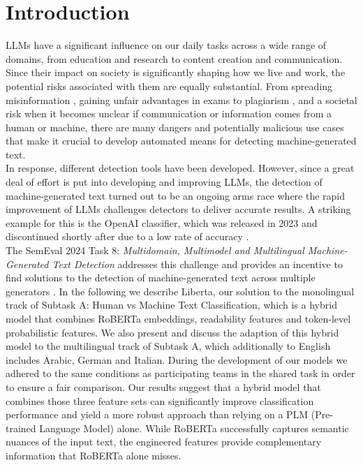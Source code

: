 \documentclass[11pt]{article}
\begin{document}
\section{Introduction}
LLMs have a significant influence on our daily tasks across a wide range of domains, from education and research to 
content creation and communication. Since their impact on society is significantly shaping how we live and work, 
the potential risks associated with them are equally substantial. From spreading misinformation \cite{kreps2022all}, gaining 
unfair advantages in exams to plagiarism \cite{wahle2022large}, and a societal risk when it becomes unclear if 
communication or information comes from a human or machine, there are many dangers and potentially malicious use cases 
that make it crucial to develop automated means for detecting machine-generated text.\\
In response, different detection tools have been developed. However, since a great deal of effort is put into developing
and improving LLMs, the detection of machine-generated text turned out to be an ongoing arms race where the rapid 
improvement of LLMs challenges detectors to deliver accurate results. A striking example for this is the OpenAI 
classifier, which was released in 2023 and discontinued shortly after due to a low rate of accuracy \cite{OPAI}.\\
The SemEval 2024 Task 8: \emph{Multidomain, Multimodel and Multilingual Machine-Generated Text Detection} addresses 
this challenge and provides an incentive to find solutions to the detection of machine-generated text across multiple 
generators \cite{wang2024semeval}. In the following we describe Liberta, our solution to the monolingual track of Subtask A: Human vs Machine Text 
Classification, which is a hybrid model that combines RoBERTa embeddings, readability features and token-level 
probabilistic features.
We also present and discuss the adaption of this hybrid model to the multilingual track of Subtask A, which additionally 
to English includes Arabic, German and Italian. During the development of our models we adhered to the same conditions as participating 
teams in the shared task in order to ensure a fair comparison. 
Our results suggest that a hybrid model that combines those three feature sets can significantly improve 
classification performance and yield a more robust approach than relying on a PLM (Pre-trained Language Model) alone. While RoBERTa successfully 
captures semantic nuances of the input text, the engineered features provide complementary information that RoBERTa 
alone misses. 
\end{document}
